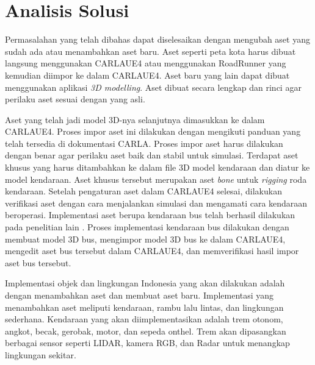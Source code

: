\section{Analisis Solusi}


Permasalahan yang telah dibahas dapat diselesaikan dengan mengubah aset yang
sudah ada atau menambahkan aset baru. Aset seperti peta kota harus dibuat
langsung menggunakan CARLAUE4 atau menggunakan RoadRunner yang kemudian diimpor
ke dalam CARLAUE4. Aset baru yang lain dapat dibuat menggunakan aplikasi
\textit{3D modelling}. Aset dibuat secara lengkap dan rinci agar perilaku aset
sesuai dengan yang asli.

Aset yang telah jadi model 3D-nya selanjutnya dimasukkan ke dalam CARLAUE4.
Proses impor aset ini dilakukan dengan mengikuti panduan yang telah tersedia di
dokumentasi CARLA. Proses impor aset harus dilakukan dengan benar agar perilaku
aset baik dan stabil untuk simulasi. Terdapat aset khusus yang harus ditambahkan
ke dalam file 3D model kendaraan dan diatur ke model kendaraan. Aset khusus
tersebut merupakan aset \textit{bone} untuk \textit{rigging} roda kendaraan.
Setelah pengaturan aset dalam CARLAUE4 selesai, dilakukan verifikasi aset dengan
cara menjalankan simulasi dan mengamati cara kendaraan beroperasi. Implementasi
aset berupa kendaraan bus telah berhasil dilakukan pada penelitian lain
\parencite{related-work-xiang}. Proses implementasi kendaraan bus dilakukan
dengan membuat model 3D bus, mengimpor model 3D bus ke dalam CARLAUE4, mengedit
aset bus tersebut dalam CARLAUE4, dan memverifikasi hasil impor aset bus
tersebut.


Implementasi objek dan lingkungan Indonesia yang akan dilakukan adalah dengan
menambahkan aset dan membuat aset baru. Implementasi yang menambahkan aset
meliputi kendaraan, rambu lalu lintas, dan lingkungan sederhana. Kendaraan yang
akan diimplementasikan adalah trem otonom, angkot, becak, gerobak, motor, dan
sepeda onthel. Trem akan dipasangkan berbagai sensor seperti LIDAR, kamera RGB,
dan Radar untuk menangkap lingkungan sekitar.



